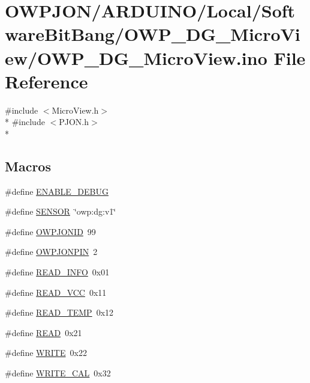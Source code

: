 \hypertarget{OWP__DG__MicroView_8ino}{\section{O\-W\-P\-J\-O\-N/\-A\-R\-D\-U\-I\-N\-O/\-Local/\-Software\-Bit\-Bang/\-O\-W\-P\-\_\-\-D\-G\-\_\-\-Micro\-View/\-O\-W\-P\-\_\-\-D\-G\-\_\-\-Micro\-View.ino File Reference}
\label{OWP__DG__MicroView_8ino}
}
{\ttfamily \#include $<$Micro\-View.\-h$>$}\\*
{\ttfamily \#include $<$P\-J\-O\-N.\-h$>$}\\*
\subsection*{Macros}
\begin{DoxyCompactItemize}
\item 
\#define \hyperlink{OWP__DG__MicroView_8ino_a432138093c53d7580af9ec5c5dca387f}{E\-N\-A\-B\-L\-E\-\_\-\-D\-E\-B\-U\-G}
\item 
\#define \hyperlink{OWP__DG__MicroView_8ino_a84f1ead330bbcc83a63929c4726080d7}{S\-E\-N\-S\-O\-R}~\char`\"{}owp\-:dg\-:v1\char`\"{}
\item 
\#define \hyperlink{OWP__DG__MicroView_8ino_aff6283040066cbe0e6d17cbcd83abffc}{O\-W\-P\-J\-O\-N\-I\-D}~99
\item 
\#define \hyperlink{OWP__DG__MicroView_8ino_a56e661b1bfea8fcdd1bc25c6cdfe2a73}{O\-W\-P\-J\-O\-N\-P\-I\-N}~2
\item 
\#define \hyperlink{OWP__DG__MicroView_8ino_ae9d85efda88bdfdba5ca9fe92f557dd9}{R\-E\-A\-D\-\_\-\-I\-N\-F\-O}~0x01
\item 
\#define \hyperlink{OWP__DG__MicroView_8ino_a3563b296d5f60635a1256e8a12261d74}{R\-E\-A\-D\-\_\-\-V\-C\-C}~0x11
\item 
\#define \hyperlink{OWP__DG__MicroView_8ino_ac8c23082885adeec4834469b64e00bb9}{R\-E\-A\-D\-\_\-\-T\-E\-M\-P}~0x12
\item 
\#define \hyperlink{OWP__DG__MicroView_8ino_ada74e7db007a68e763f20c17f2985356}{R\-E\-A\-D}~0x21
\item 
\#define \hyperlink{OWP__DG__MicroView_8ino_aa10f470e996d0f51210d24f442d25e1e}{W\-R\-I\-T\-E}~0x22
\item 
\#define \hyperlink{OWP__DG__MicroView_8ino_a9418b096dba157494f523dc01b82a760}{W\-R\-I\-T\-E\-\_\-\-C\-A\-L}~0x32
\end{DoxyCompactItemize}
